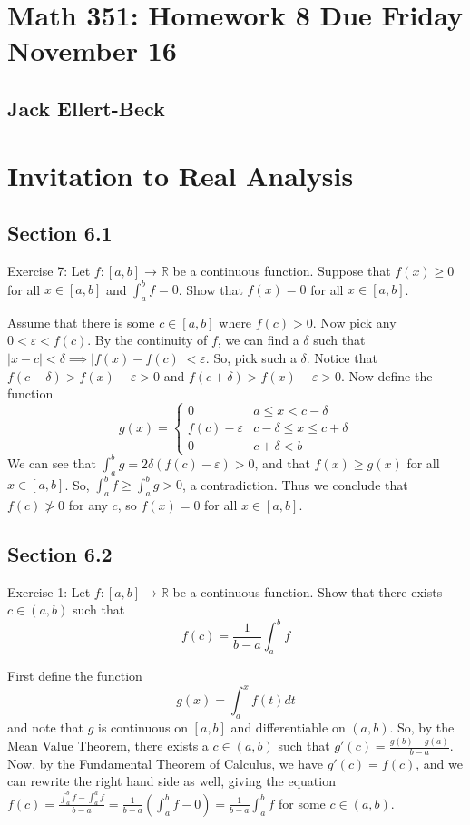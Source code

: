 \documentclass[11pt]{article}
\newcommand{\R}{\mathbb{R}}
\begin{document}
\setlength{\parindent}{0pt}
\setlength{\parskip}{9pt}


\section*{Math 351: Homework 8  Due Friday November 16}
\subsection*{Jack Ellert-Beck}

\bigskip

\section*{Invitation to Real Analysis}

\subsection*{Section 6.1}

Exercise 7: Let $f:[a,b]\to\R$ be a continuous function. Suppose that
$f(x)\geq0$ for all $x\in[a,b]$ and $\int_a^bf=0$. Show that $f(x)=0$
for all $x\in[a,b]$.

Assume that there is some $c\in[a,b]$ where $f(c)>0$. Now pick any $0<\varepsilon<f(c)$.
By the continuity of $f$, we can find a $\delta$ such that
$|x-c|<\delta\implies|f(x)-f(c)|<\varepsilon$. So, pick such a $\delta$. Notice
that $f(c-\delta)>f(x)-\varepsilon>0$ and $f(c+\delta)>f(x)-\varepsilon>0$.
Now define the function
\[
g(x)=\begin{cases}
        0 & a\leq x<c-\delta \\
        f(c)-\varepsilon & c-\delta\leq x\leq c+\delta \\
        0 & c+\delta<b
    \end{cases}
\]
We can see that $\int_a^bg=2\delta(f(c)-\varepsilon)>0$, and that $f(x)\geq g(x)$ for
all $x\in[a,b]$. So, $\int_a^bf\geq\int_a^bg>0$, a contradiction. Thus we conclude
that $f(c)\ngtr0$ for any $c$, so $f(x)=0$ for all $x\in[a,b]$.
 
\subsection*{Section 6.2}

Exercise 1: Let $f:[a,b]\to\R$ be a continuous function. Show that there exists
$c\in(a,b)$ such that
\[ f(c)=\frac{1}{b-a}\int_a^bf \]

First define the function
\[ g(x) = \int_a^xf(t)dt \]
and note that $g$ is continuous on $[a,b]$ and differentiable on $(a,b)$.
So, by the Mean Value Theorem, there exists a $c\in(a,b)$ such that
$g'(c)=\frac{g(b)-g(a)}{b-a}$. Now, by the Fundamental Theorem of Calculus, we have
$g'(c)=f(c)$, and we can rewrite the right hand side as well, giving the equation
$f(c)=\frac{\int_a^bf-\int_a^af}{b-a}=\frac{1}{b-a}(\int_a^bf-0)=\frac{1}{b-a}\int_a^bf$
for some $c\in(a,b)$.
\end{document}
